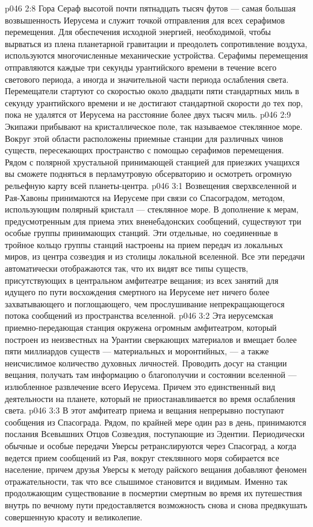 \vs p046 2:8 \pc Гора Сераф высотой почти пятнадцать тысяч футов --- самая большая возвышенность Иерусема и служит точкой отправления для всех серафимов перемещения. Для обеспечения исходной энергией, необходимой, чтобы вырваться из плена планетарной гравитации и преодолеть сопротивление воздуха, используются многочисленные механические устройства. Серафимы перемещения отправляются каждые три секунды урантийского времени в течение всего светового периода, а иногда и значительной части периода ослабления света. Перемещатели стартуют со скоростью около двадцати пяти стандартных миль в секунду урантийского времени и не достигают стандартной скорости до тех пор, пока не удалятся от Иерусема на расстояние более двух тысяч миль.
\vs p046 2:9 Экипажи прибывают на кристаллическое поле, так называемое стеклянное море. Вокруг этой области расположены приемные станции для различных чинов существ, пересекающих пространство с помощью серафимов перемещения. Рядом с полярной хрустальной принимающей станцией для приезжих учащихся вы сможете подняться в перламутровую обсерваторию и осмотреть огромную рельефную карту всей планеты\hyp{}центра.
\vs p046 3:1 Возвещения сверхвселенной и Рая\hyp{}Хавоны принимаются на Иерусеме при связи со Спасоградом, методом, использующим полярный кристалл --- стеклянное море. В дополнение к мерам, предусмотренным для приема этих вненебадонских сообщений, существуют три особые группы принимающих станций. Эти отдельные, но соединенные в тройное кольцо группы станций настроены на прием передач из локальных миров, из центра созвездия и из столицы локальной вселенной. Все эти передачи автоматически отображаются так, что их видят все типы существ, присутствующих в центральном амфитеатре вещания; из всех занятий для идущего по пути восхождения смертного на Иерусеме нет ничего более захватывающего и поглощающего, чем прослушивание непрекращающегося потока сообщений из пространства вселенной.
\vs p046 3:2 Эта иерусемская приемно\hyp{}передающая станция окружена огромным амфитеатром, который построен из неизвестных на Урантии сверкающих материалов и вмещает более пяти миллиардов существ --- материальных и моронтийных, --- а также неисчислимое количество духовных личностей. Проводить досуг на станции вещания, получать там информацию о благополучии и состоянии вселенной --- излюбленное развлечение всего Иерусема. Причем это единственный вид деятельности на планете, который не приостанавливается во время ослабления света.
\vs p046 3:3 В этот амфитеатр приема и вещания непрерывно поступают сообщения из Спасограда. Рядом, по крайней мере один раз в день, принимаются послания Всевышних Отцов Созвездия, поступающие из Эдентии. Периодически обычные и особые передачи Уверсы ретранслируются через Спасоград, а когда ведется прием сообщений из Рая, вокруг стеклянного моря собирается все население, причем друзья Уверсы к методу райского вещания добавляют феномен отражательности, так что все слышимое становится и видимым. Именно так продолжающим существование в посмертии смертным во время их путешествия внутрь по вечному пути предоставляется возможность снова и снова предвкушать совершенную красоту и великолепие.
